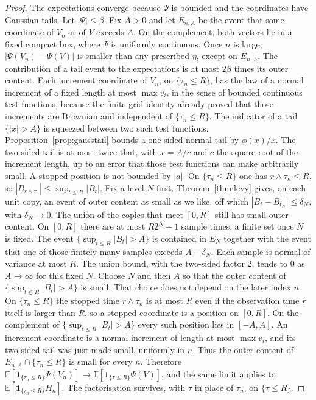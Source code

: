 \begin{proof}
The expectations converge because $\Psi$ is bounded and the coordinates have Gaussian tails. Let $|\Psi|\le\beta$. Fix $A>0$ and let $E_{n,A}$ be the event that some coordinate of $V_n$ or of $V$ exceeds $A$. On the complement, both vectors lie in a fixed compact box, where $\Psi$ is uniformly continuous. Once $n$ is large, $|\Psi(V_n)-\Psi(V)|$ is smaller than any prescribed $\eta$, except on $E_{n,A}$. The contribution of a tail event to the expectations is at most $2\beta$ times its outer content. Each increment coordinate of $V_n$, on $\{\tau_n\le R\}$, has the law of a normal increment of a fixed length at most $\max v_i$, in the sense of bounded continuous test functions, because the finite-grid identity already proved that those increments are Brownian and independent of $\{\tau_n\le R\}$. The indicator of a tail $\{|x|>A\}$ is squeezed between two such test functions. Proposition~\ref{prop:gausstail} bounds a one-sided normal tail by $\phi(x)/x$. The two-sided tail is at most twice that, with $x=A/c$ and $c$ the square root of the increment length, up to an error that those test functions can make arbitrarily small. A stopped position is not bounded by $|a|$. On $\{\tau_n\le R\}$ one has $r\wedge\tau_n\le R$, so $|B_{r\wedge\tau_n}|\le\sup_{t\le R}|B_t|$. Fix a level $N$ first. Theorem~\ref{thm:levy} gives, on each unit copy, an event of outer content as small as we like, off which $|B_t-B_{t_N}|\le\delta_N$, with $\delta_N\to0$. The union of the copies that meet $[0,R]$ still has small outer content. On $[0,R]$ there are at most $R2^N+1$ sample times, a finite set once $N$ is fixed. The event $\{\sup_{t\le R}|B_t|>A\}$ is contained in $E_N$ together with the event that one of those finitely many samples exceeds $A-\delta_N$. Each sample is normal of variance at most $R$. The union bound, with the two-sided factor $2$, tends to $0$ as $A\to\infty$ for this fixed $N$. Choose $N$ and then $A$ so that the outer content of $\{\sup_{t\le R}|B_t|>A\}$ is small. That choice does not depend on the later index $n$. On $\{\tau_n\le R\}$ the stopped time $r\wedge\tau_n$ is at most $R$ even if the observation time $r$ itself is larger than $R$, so a stopped coordinate is a position on $[0,R]$. On the complement of $\{\sup_{t\le R}|B_t|>A\}$ every such position lies in $[-A,A]$. An increment coordinate is a normal increment of length at most $\max v_i$, and its two-sided tail was just made small, uniformly in $n$. Thus the outer content of $E_{n,A}\cap\{\tau_n\le R\}$ is small for every $n$. Therefore $\mathbb E[\mathbf1_{\{\tau_n\le R\}}\Psi(V_n)]\to\mathbb E[\mathbf1_{\{\tau\le R\}}\Psi(V)]$, and the same limit applies to $\mathbb E[\mathbf1_{\{\tau_n\le R\}}H_n]$. The factorisation survives, with $\tau$ in place of $\tau_n$, on $\{\tau\le R\}$.


\end{proof}
